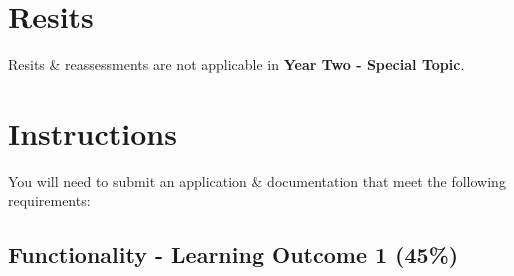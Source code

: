 \documentclass{article}
\begin{document}
\section*{Resits}
Resits \& reassessments are not applicable in \textbf{Year Two - Special Topic}. 

\newpage

\section*{Instructions}
You will need to submit an application \& documentation that meet the following requirements:

\subsection*{Functionality - Learning Outcome 1 (45\%)}
\end{document}
